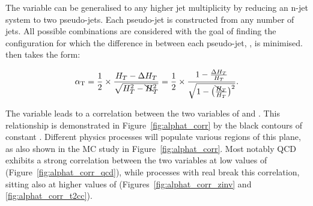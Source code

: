 The \alphat variable can be generalised to any higher jet multiplicity by reducing an n-jet
system to two pseudo-jets. Each pseudo-jet is constructed from any number of jets.
All possible combinations are considered with the goal of finding the configuration
for which the difference in \HT between each pseudo-jet, \deltaHT, is minimised.
\alphat then takes the form:

% 
\begin{equation}
\alpha_{\text{T}} = \frac{1}{2} \times \frac{H_T-\Delta H_T}{\sqrt{H_T^2 - \bcancel{H}_T^2}} = 
\frac{1}{2} \times \frac{1-\frac{\Delta H_T}{H_T}}{\sqrt{1 - \big(\frac{\bcancel{H}_T}
{H_T}\big)^2}}.
\label{eq:alphat_njet}
\end{equation}
% 

The \alphat variable leads to a correlation between the two variables of \mht
and \deltaHT. This relationship is demonstrated in Figure~\ref{fig:alphat_corr}
by the black contours of constant \alphat. Different physics processes
will populate various regions of this plane, as also shown in the MC study in
Figure~\ref{fig:alphat_corr}. Most notably QCD exhibits a strong
correlation between the two variables at low values of \alphat
(Figure~\ref{fig:alphat_corr_qcd}), while processes with real \met break this
correlation, sitting also at higher values of \alphat
(Figures~\ref{fig:alphat_corr_zinv} and \ref{fig:alphat_corr_t2cc}).

